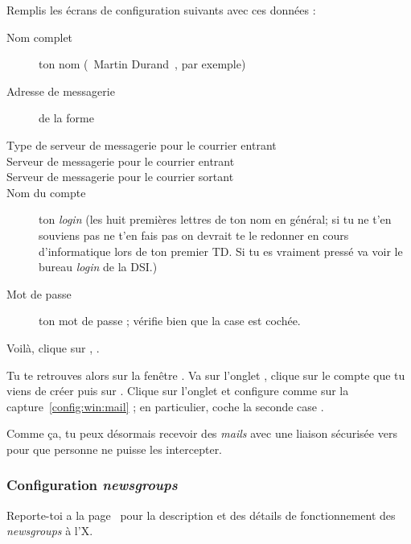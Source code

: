 Remplis les écrans de configuration suivants avec ces données :
\begin{description}
  \item[Nom complet] ton nom (\guillemotleft~Martin Durand~\guillemotright , par exemple)
  \item[Adresse de messagerie] de la forme 
  \item[Type de serveur de messagerie pour le courrier entrant] 
  \item[Serveur de messagerie pour le courrier entrant] 
  \item[Serveur de messagerie pour le courrier sortant] 
  \item[Nom du compte] ton \emph{login}  (les huit premières lettres de ton nom en général; si tu ne t'en souviens pas ne t'en fais pas on devrait te le redonner en cours d'informatique lors de ton premier TD. Si tu es vraiment pressé va voir le bureau \emph{login} de la DSI.)
  \item[Mot de passe] ton mot de passe  ;
       vérifie bien que la case  est cochée.
\end{description}

Voilà, clique sur , .

Tu te retrouves alors sur la fenêtre . Va sur
l'onglet , clique sur le compte que tu viens de créer
puis sur . Clique sur l'onglet  et
configure comme sur la capture~\ref{config:win:mail} ; en
particulier, coche la seconde case .

Comme \c{c}a, tu peux désormais recevoir des \emph{mails} avec une liaison
sécurisée vers  pour que personne ne puisse les
intercepter.



\subsubsection{Configuration \emph{newsgroups}}
Reporte-toi a la page~\pageref{newsgroups} pour la description et des détails de fonctionnement des \emph{newsgroups} à l'X.

